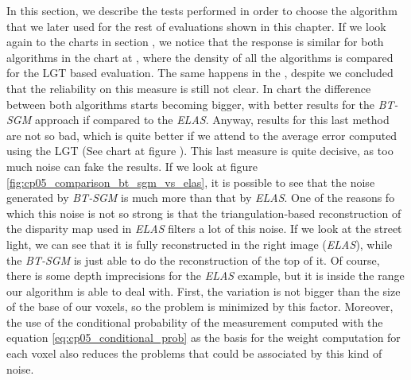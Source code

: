 In this section, we describe the tests performed in order to choose the algorithm that we later used for the rest of evaluations shown in this chapter. If we look again to the charts in section , we notice that the response is similar for both algorithms in the chart at , where the density of all the algorithms is compared for the \ac{LGT} based evaluation. The same happens in the , despite we concluded that the reliability on this measure is still not clear. In chart  the difference between both algorithms starts becoming bigger, with better results for the \emph{BT-SGM} approach if compared to the \emph{ELAS}. Anyway, results for this last method are not so bad, which is quite better if we attend to the average error computed using the \ac{LGT} (See chart at figure ). This last measure is quite decisive, as too much noise can fake the results. If we look at figure \ref{fig:cp05_comparison_bt_sgm_vs_elas}, it is possible to see that the noise generated by \emph{BT-SGM} is much more than that by \emph{ELAS}. One of the reasons fo which this noise is not so strong is that the triangulation-based reconstruction of the disparity map used in \emph{ELAS} filters a lot of this noise. If we look at the street light, we can see that it is fully reconstructed in the right image (\emph{ELAS}), while the \emph{BT-SGM} is just able to do the reconstruction of the top of it. Of course, there is some depth imprecisions for the \emph{ELAS} example, but it is inside the range our algorithm is able to deal with. First, the variation is not bigger than the size of the base of our voxels, so the problem is minimized by this factor. Moreover, the use of the conditional probability of the measurement computed with the equation \ref{eq:cp05_conditional_prob} as the basis for the weight computation for each voxel also reduces the problems that could be associated by this kind of noise.

